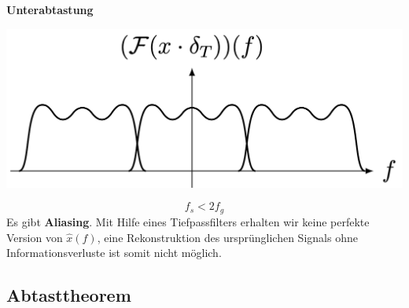 \documentclass[11pt]{article}
\begin{document}
\begin{minipage}[t]{0.32\textwidth}
    \begin{center}
        \textbf{Unterabtastung}
    \end{center}
    \vspace*{-0.5cm}
    \begin{center}
        \includegraphics[width=0.75\linewidth]{docimgs/aliasing1.png}
    \end{center}
    $$f_s < 2f_g$$
    Es gibt \textbf{Aliasing}. Mit Hilfe eines Tiefpassfilters erhalten wir keine perfekte Version von $\hat{x}(f)$, eine Rekonstruktion des ursprünglichen Signals ohne Informationsverluste ist somit nicht möglich.
\end{minipage}

\pagebreak

\subsection*{Abtasttheorem}
\vspace*{-0.5cm}
%
\end{document}
